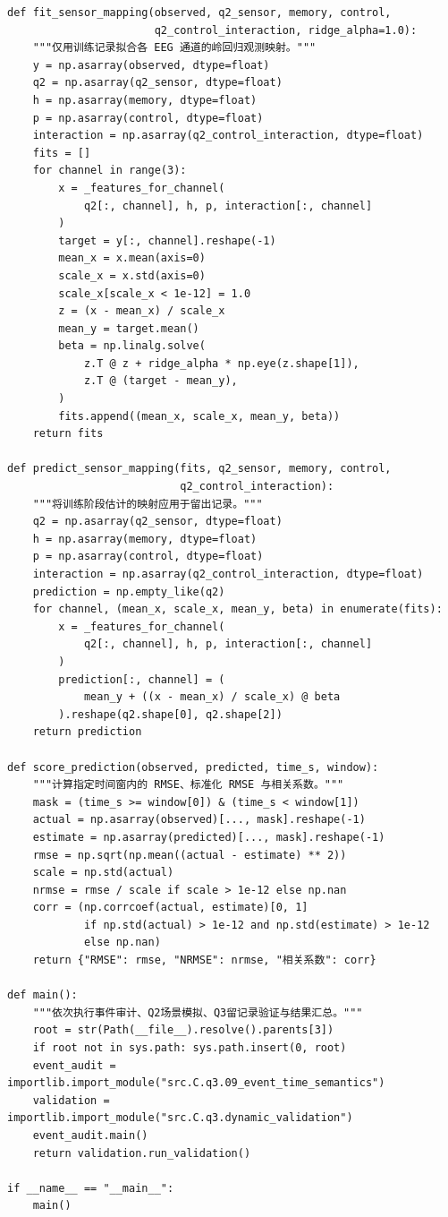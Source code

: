 \begin{appendices}
\begin{lstlisting}[style=appendixPython]
def fit_sensor_mapping(observed, q2_sensor, memory, control,
                       q2_control_interaction, ridge_alpha=1.0):
    """仅用训练记录拟合各 EEG 通道的岭回归观测映射。"""
    y = np.asarray(observed, dtype=float)
    q2 = np.asarray(q2_sensor, dtype=float)
    h = np.asarray(memory, dtype=float)
    p = np.asarray(control, dtype=float)
    interaction = np.asarray(q2_control_interaction, dtype=float)
    fits = []
    for channel in range(3):
        x = _features_for_channel(
            q2[:, channel], h, p, interaction[:, channel]
        )
        target = y[:, channel].reshape(-1)
        mean_x = x.mean(axis=0)
        scale_x = x.std(axis=0)
        scale_x[scale_x < 1e-12] = 1.0
        z = (x - mean_x) / scale_x
        mean_y = target.mean()
        beta = np.linalg.solve(
            z.T @ z + ridge_alpha * np.eye(z.shape[1]),
            z.T @ (target - mean_y),
        )
        fits.append((mean_x, scale_x, mean_y, beta))
    return fits

def predict_sensor_mapping(fits, q2_sensor, memory, control,
                           q2_control_interaction):
    """将训练阶段估计的映射应用于留出记录。"""
    q2 = np.asarray(q2_sensor, dtype=float)
    h = np.asarray(memory, dtype=float)
    p = np.asarray(control, dtype=float)
    interaction = np.asarray(q2_control_interaction, dtype=float)
    prediction = np.empty_like(q2)
    for channel, (mean_x, scale_x, mean_y, beta) in enumerate(fits):
        x = _features_for_channel(
            q2[:, channel], h, p, interaction[:, channel]
        )
        prediction[:, channel] = (
            mean_y + ((x - mean_x) / scale_x) @ beta
        ).reshape(q2.shape[0], q2.shape[2])
    return prediction

def score_prediction(observed, predicted, time_s, window):
    """计算指定时间窗内的 RMSE、标准化 RMSE 与相关系数。"""
    mask = (time_s >= window[0]) & (time_s < window[1])
    actual = np.asarray(observed)[..., mask].reshape(-1)
    estimate = np.asarray(predicted)[..., mask].reshape(-1)
    rmse = np.sqrt(np.mean((actual - estimate) ** 2))
    scale = np.std(actual)
    nrmse = rmse / scale if scale > 1e-12 else np.nan
    corr = (np.corrcoef(actual, estimate)[0, 1]
            if np.std(actual) > 1e-12 and np.std(estimate) > 1e-12
            else np.nan)
    return {"RMSE": rmse, "NRMSE": nrmse, "相关系数": corr}

def main():
    """依次执行事件审计、Q2场景模拟、Q3留记录验证与结果汇总。"""
    root = str(Path(__file__).resolve().parents[3])
    if root not in sys.path: sys.path.insert(0, root)
    event_audit = importlib.import_module("src.C.q3.09_event_time_semantics")
    validation = importlib.import_module("src.C.q3.dynamic_validation")
    event_audit.main()
    return validation.run_validation()

if __name__ == "__main__":
    main()

\end{lstlisting}

\end{appendices}
